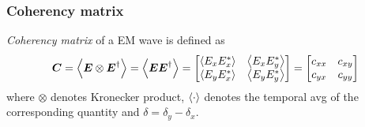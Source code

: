\documentclass[11pt,a4paper]{article}
\numberwithin{equation}{section}
\begin{document}
\subsubsection{Coherency matrix}
\textit{Coherency matrix} of a EM wave is defined as \cite{WO} 
\begin{align}
	\boldsymbol{C}=\expval{\boldsymbol{E}\otimes\boldsymbol{E}^\dagger}= \expval{\boldsymbol{E}\boldsymbol{E}^\dagger}=
	\begin{bmatrix}
		\expval{E_xE_x^\ast} & \expval{E_xE_y^\ast}\\
		\expval{E_yE_x^\ast} & \expval{E_yE_y^\ast}
	\end{bmatrix}=
\begin{bmatrix}
	c_{xx} & c_{xy}\\
	c_{yx} & c_{yy}
\end{bmatrix}\label{coherency matrix}
\end{align}
where $\otimes$ denotes Kronecker product, $\expval{\cdot}$ denotes the temporal avg of the corresponding quantity and $\delta= \delta_y-\delta_x$.
\end{document}
